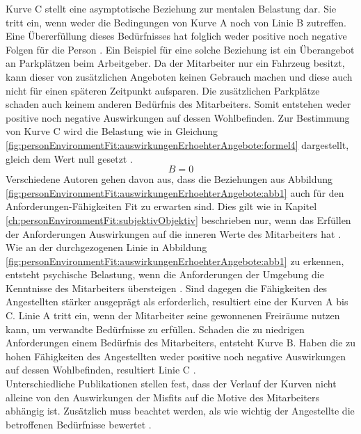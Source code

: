 Kurve C stellt eine asymptotische Beziehung zur mentalen Belastung dar. Sie tritt ein, wenn weder die Bedingungen von Kurve A noch von Linie B zutreffen. Eine Übererfüllung dieses Bedürfnisses hat folglich weder positive noch negative Folgen für die Person \cite{mechanismsOfJobStressAndStrain:1982}. Ein Beispiel für eine solche Beziehung ist ein Überangebot an Parkplätzen beim Arbeitgeber. Da der Mitarbeiter nur ein Fahrzeug besitzt, kann dieser von zusätzlichen Angeboten keinen Gebrauch machen und diese auch nicht für einen späteren Zeitpunkt aufsparen. Die zusätzlichen Parkplätze schaden auch keinem anderen Bedürfnis des Mitarbeiters. Somit entstehen weder positive noch negative Auswirkungen auf dessen Wohlbefinden. Zur Bestimmung von Kurve C wird die Belastung wie in Gleichung \ref{fig:personEnvironmentFit:auswirkungenErhoehterAngebote:formel4} dargestellt, gleich dem Wert null gesetzt \cite[S. 2]{edwards:1993}.
\begin{equation}
	B = 0
	\label{fig:personEnvironmentFit:auswirkungenErhoehterAngebote:formel4}
\end{equation}
Verschiedene Autoren gehen davon aus, dass die Beziehungen aus Abbildung \ref{fig:personEnvironmentFit:auswirkungenErhoehterAngebote:abb1} auch für den Anforderungen-Fähigkeiten Fit zu erwarten sind. Dies gilt wie in Kapitel \ref{ch:personEnvironmentFit:subjektivObjektiv} beschrieben nur, wenn das Erfüllen der Anforderungen Auswirkungen auf die inneren Werte des Mitarbeiters hat \cite{mechanismsOfJobStressAndStrain:1982, harrison:1978}. Wie an der durchgezogenen Linie in Abbildung \ref{fig:personEnvironmentFit:auswirkungenErhoehterAngebote:abb1} zu erkennen, entsteht psychische Belastung, wenn die Anforderungen der Umgebung die Kenntnisse des Mitarbeiters übersteigen \cite[S. 5]{schuler:1980}. Sind dagegen die Fähigkeiten des Angestellten stärker ausgeprägt als erforderlich, resultiert eine der Kurven A bis C. Linie A tritt ein, wenn der Mitarbeiter seine gewonnenen Freiräume nutzen kann, um verwandte Bedürfnisse zu erfüllen. Schaden die zu niedrigen Anforderungen einem Bedürfnis des Mitarbeiters, entsteht Kurve B. Haben die zu hohen Fähigkeiten des Angestellten weder positive noch negative Auswirkungen auf dessen Wohlbefinden, resultiert Linie C \cite[S. 22f.]{edwards:2008}.\\
Unterschiedliche Publikationen stellen fest, dass der Verlauf der Kurven nicht alleine von den Auswirkungen der Misfits auf die Motive des Mitarbeiters abhängig ist. Zusätzlich muss beachtet werden, als wie wichtig der Angestellte die betroffenen Bedürfnisse bewertet \cite[S. 9f.]{edwards:1996}. 

